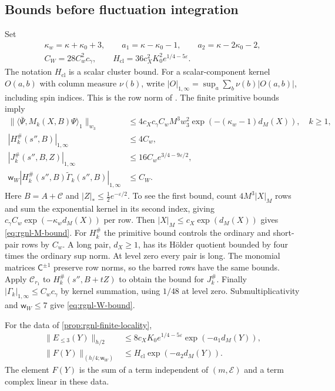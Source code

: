 \subsection{Bounds before fluctuation integration}
\label{subsec:rgnl-finite-bounds}

Set
\[
 \begin{gathered}
 \kappa_w=\kappa+\kappa_0+3,\qquad
 a_1=\kappa-\kappa_0-1,\qquad a_2=\kappa-2\kappa_0-2,\\
 C_W=28C_w^2c_\gamma,
 \qquad H_{\mathrm{cl}}=36c_X^2K_0^2e^{1/4-5\varepsilon}.
 \end{gathered}
\]
The notation $H_{\mathrm{cl}}$ is a scalar cluster bound. For a
scalar-component kernel $O(a,b)$ with column measure $\nu(b)$, write
$|O|_{1,\infty}=\sup_a\sum_b\nu(b)|O(a,b)|$, including spin indices.
This is the row norm of \cite[Theorem~B]{NormalizedContraction}.
The finite primitive bounds imply
\begin{align}
 \|\langle\bar\Psi,M_k(X,B)\Psi\rangle_1\|_{w_3}
 &\le4c_Xc_\gamma C_wM^3w_3^2
                   \exp(-(\kappa_w-1)d_M(X)),\quad k\ge1,
                                      \label{eq:rgnl-M-bound}\\
 |H_k^\#(s'',B)|_{1,\infty}&\le4C_w,\\
 |J_k^\#(s'',B,Z)|_{1,\infty}
                  &\le16C_we^{3/4-9\varepsilon/2},\\
 \mathsf w_W|H_k^\#(s'',B)\widetilde\Gamma_k(s'',B)|_{1,\infty}
                  &\le C_W.           \label{eq:rgnl-W-bound}
\end{align}
Here $B=A+\mathscr C$ and $|Z|_*\le\frac12e^{-\varepsilon/2}$.
To see the first bound, count $4M^3|X|_M$ rows and sum
the exponential kernel in its second index, giving
$c_\gamma C_w \exp(-\kappa_wd_M(X))$ per row.
Then $|X|_M\le c_X\exp(d_M(X))$ gives
\eqref{eq:rgnl-M-bound}.
For $H_k^\#$ the primitive bound controls the ordinary
and short-pair rows by $C_w$. A long pair, $d_X\ge1$,
has its H\"older quotient bounded by four times the
ordinary sup norm. At level zero every pair is long.
The monomial matrices $\mathsf C^{\pm1}$ preserve row norms,
so the barred rows have the same bounds.
Apply $\mathcal C_{r_1}$ to
$H_k^\#(s'',B+tZ)$ to obtain the bound for $J_k^\#$.
Finally $|\Gamma_k|_{1,\infty}\le C_wc_\gamma$ by kernel
summation, using $1/48$ at level zero. Submultiplicativity
and $\mathsf w_W\le7$ give \eqref{eq:rgnl-W-bound}.

\begin{proposition}\label{prop:rgnl-finite-bounds}
For the data of \cref{prop:rgnl-finite-locality},
\begin{align}
 \|E_{\le3}(Y)\|_{h/2}
       &\le8c_XK_0e^{1/4-5\varepsilon}\exp(-a_1d_M(Y)),
                                      \label{eq:rgnl-E3-bound}\\
 \|F(Y)\|_{(h/4;\mathsf w_W)}
       &\le H_{\mathrm{cl}}\exp(-a_2d_M(Y)).
                                      \label{eq:rgnl-F-bound}
\end{align}
The element $F(Y)$ is the sum of a term independent of
$(m,\mathscr E)$ and a term complex linear in these data.
\end{proposition}

